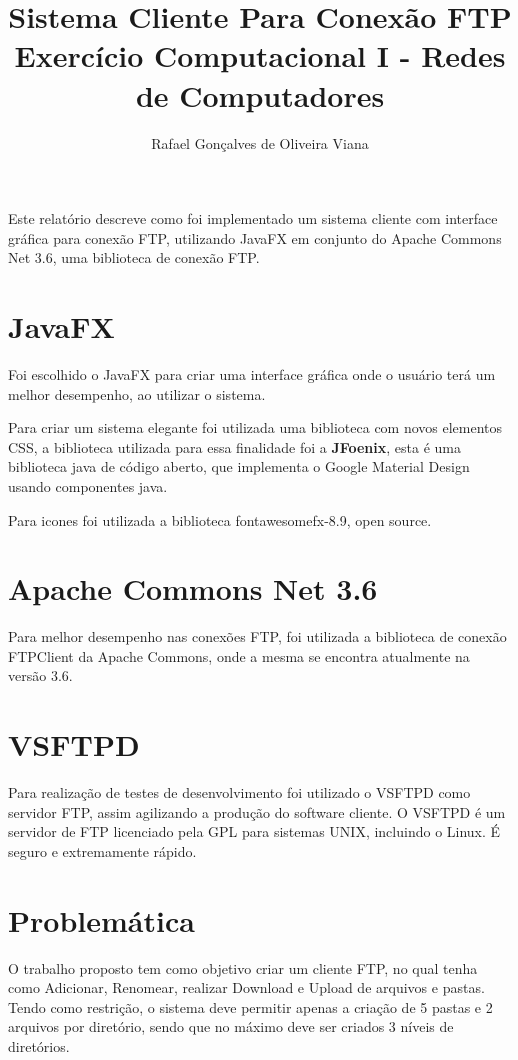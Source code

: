 \documentclass[12pt]{article}
\title{Sistema Cliente Para Conexão FTP  \\ Exercício Computacional I - Redes de Computadores}
\author{Rafael Gonçalves de Oliveira Viana\inst{1} }
\begin{document}
 

\maketitle

     
\begin{resumo} 	
  Este relatório descreve como foi implementado um sistema cliente com interface gráfica para conexão FTP, utilizando JavaFX em conjunto do Apache Commons Net 3.6, uma biblioteca de conexão FTP.
\end{resumo}


\section{JavaFX}

Foi escolhido o JavaFX para criar uma interface gráfica onde o usuário terá um melhor desempenho, ao utilizar o sistema.\cite{topley2010javafx}

Para criar um sistema elegante foi utilizada uma biblioteca com novos elementos CSS, a biblioteca utilizada para essa finalidade foi  a \textbf{JFoenix}, esta é uma biblioteca java de código aberto, que implementa o Google Material Design usando componentes java.\cite{JFoenix}

Para icones foi utilizada a biblioteca fontawesomefx-8.9, open source.\cite{FontAwesomeFX}
	
\section{Apache Commons Net 3.6} 

Para melhor desempenho nas conexões FTP, foi utilizada a biblioteca de conexão FTPClient da Apache Commons, onde a mesma se encontra atualmente na versão 3.6.\cite{Apache}

\section{VSFTPD}
Para realização de testes de desenvolvimento foi utilizado o VSFTPD como servidor FTP, assim agilizando a produção do software cliente.
O VSFTPD é um servidor de FTP licenciado pela GPL para sistemas UNIX, incluindo o Linux. É seguro e extremamente rápido.\cite{bauer2004paranoid}

\section{Problemática}
O trabalho proposto tem como objetivo criar um cliente FTP, no qual tenha como Adicionar, Renomear, realizar Download e Upload de arquivos e pastas. Tendo como restrição, o sistema deve permitir apenas a criação de 5 pastas e 2 arquivos por diretório, sendo que no máximo deve ser criados 3 níveis de diretórios.
 
\end{document}
